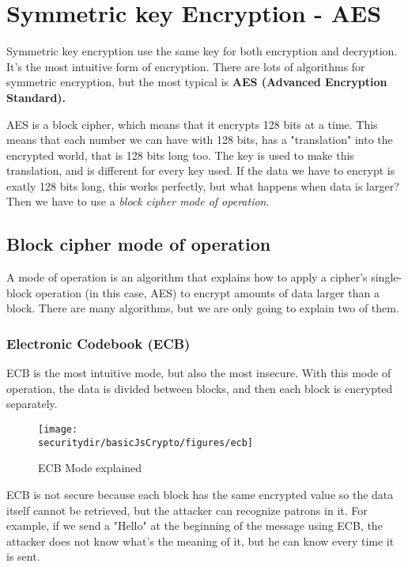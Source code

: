 \section{Symmetric key Encryption - AES}

Symmetric key encryption use the same key for both encryption and decryption. It's the most intuitive form of encryption. There are lots of algorithms for symmetric encryption, but the most typical is \textbf{AES (Advanced Encryption Standard).}

AES is a block cipher, which means that it encrypts 128 bits at a time. This means that each number we can have with 128 bits, has a "translation" into the encrypted world, that is 128 bits long too. The key is used to make this translation, and is different for every key used. If the data we have to encrypt is exatly 128 bits long, this works perfectly, but what happens when data is larger? Then we have to use a \textit{block cipher mode of operation}.

\subsection{Block cipher mode of operation}
A mode of operation is an algorithm that explains how to apply a cipher's single-block operation (in this case, AES) to encrypt amounts of data larger than a block. There are many algorithms, but we are only going to explain two of them.

\subsubsection{Electronic Codebook (ECB)}
ECB is the most intuitive mode, but also the most insecure. With this mode of operation, the data is divided between blocks, and then each block is encrypted separately.
\begin{figure}[htb]
	\begin{centering}
		\texttt{[image: \\securitydir/basicJsCrypto/figures/ecb]}
		\par\end{centering}
	\caption{\label{fig:ecb} ECB Mode explained}
\end{figure}

ECB is not secure because each block has the same encrypted value so the data itself cannot be retrieved, but the attacker can recognize patrons in it. For example, if we send a "Hello" at the beginning of the message using ECB, the attacker does not know what's the meaning of it, but he can know every time it is sent.


